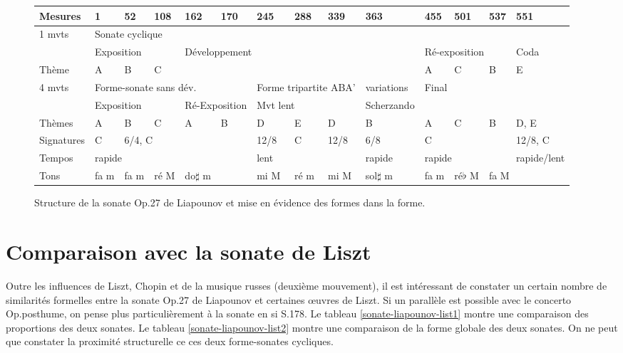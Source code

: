 \begin{figure}[!p]
  \begin{bigcenter}
    \vspace{-1cm}
     {
\begin{tabular}{|l|l|l|l|l|l|l|l|l|l|l|l|l|l|}
 \hline
   Mesures & 1 & 52 & 108 & 162 & 170 & 245 & 288 & 339 & 363 & 455 & 501 & 537 & 551 \\
 \hline
 \hline
   1 mvts & \multicolumn{13}{|l|}{Sonate cyclique}\\
 \hline
          & \multicolumn{3}{|l|}{Exposition} & \multicolumn{6}{l|}{Développement} & \multicolumn{3}{l|}{Ré-exposition} & Coda\\
 \hline
   Thème & A & B & C & \multicolumn{6}{l|}{} & A & C & B & E\\
 \hline
 \hline
   4 mvts & \multicolumn{5}{|l|}{Forme-sonate sans dév.} & \multicolumn{3}{|l|}{Forme tripartite ABA'} & variations & \multicolumn{4}{|l|}{Final}\\
 \hline
          & \multicolumn{3}{|l|}{Exposition} & \multicolumn{2}{l|}{Ré-Exposition} & \multicolumn{3}{l|}{Mvt lent} & Scherzando & \multicolumn{4}{l|}{}\\
 \hline
  Thèmes & A & B & C & A & B & D & E & D & B & A & C & B & D, E\\
 \hline
 \hline
  Signatures & C & \multicolumn{4}{|l|}{6/4, C} & 12/8 & C & 12/8 & 6/8 & \multicolumn{3}{|l|}{C} & 12/8, C\\
 \hline
  Tempos & \multicolumn{5}{|l|}{rapide} & \multicolumn{3}{|l|}{lent} & rapide & \multicolumn{3}{|l|}{rapide} & rapide/lent\\
 \hline
  Tons & fa m & fa m & ré M & \multicolumn{2}{|l|}{do$\sharp$ m} & mi M & ré m & mi M & sol$\sharp$ m & fa m & ré$\flat$ M & \multicolumn{2}{|l|}{fa M}\\
 \hline
\end{tabular}
    }
  \end{bigcenter}
  \caption{\label{structure}Structure de la sonate Op.27 de Liapounov et mise en évidence des formes dans la forme.}
\end{figure}

\section{Comparaison avec la sonate de Liszt}

Outre les influences de Liszt, Chopin et de la musique russes (deuxième mouvement), il est intéressant de constater un certain nombre de similarités formelles entre la sonate Op.27 de Liapounov et certaines œuvres de Liszt. Si un parallèle est possible avec le concerto Op.posthume, on pense plus particulièrement à la sonate en si S.178. Le tableau \ref{sonate-liapounov-list1} montre une comparaison des proportions des deux sonates. Le tableau \ref{sonate-liapounov-list2} montre une comparaison de la forme globale des deux sonates. On ne peut que constater la proximité structurelle ce ces deux forme-sonates cycliques.

